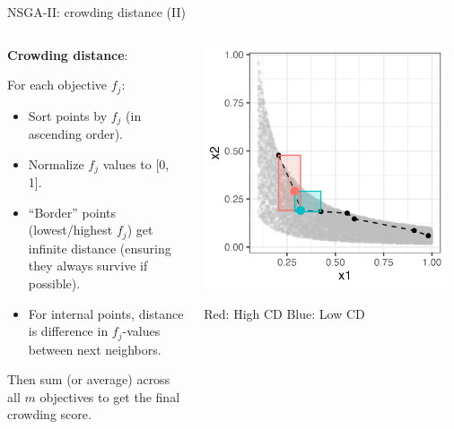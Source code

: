 \documentclass[11pt,compress,t,notes=noshow,xcolor=table]{beamer}
\begin{document}
\begin{vbframe}{NSGA-II: crowding distance (II)}

\begin{columns}
\begin{column}{0.55\textwidth}
\textbf{Crowding distance}:

For each objective $f_j$:
\begin{itemize}
\item Sort points by $f_j$ (in ascending order).
\item Normalize $f_j$ values to [0, 1].
\item “Border” points (lowest/highest $f_j$) get infinite distance (ensuring they always survive if possible).
\item For internal points, distance is difference in $f_j$-values between next neighbors.
\end{itemize}
Then sum (or average) across all $m$ objectives to get the final crowding score.
\end{column}

\begin{column}{0.45\textwidth}
\begin{center}
\includegraphics[width=0.95\textwidth]{figure_man/NSGA2_CS2.png}
\medskip

\begin{footnotesize}
Red: High CD \quad Blue: Low CD
\end{footnotesize}
\end{center}
\end{column}
\end{columns}

\end{vbframe}
\end{document}
